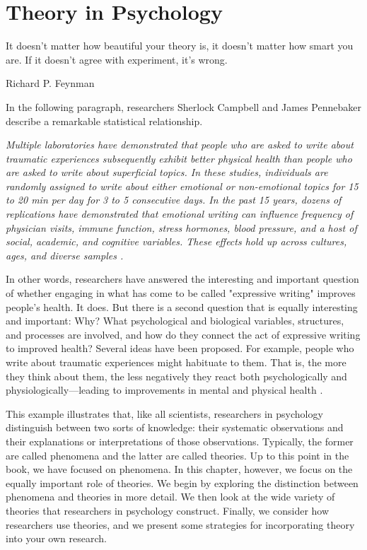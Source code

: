 \chapter{Theory in Psychology}

It doesn't matter how beautiful your theory is, it doesn't matter how smart you are. If it doesn't agree with experiment, it's wrong.

Richard P. Feynman

In the following paragraph, researchers Sherlock Campbell and James Pennebaker describe a remarkable statistical relationship.

\emph{Multiple laboratories have demonstrated that people who are asked to write about traumatic experiences subsequently exhibit better physical health than people who are asked to write about superficial topics. In these studies, individuals are randomly assigned to write about either emotional or non-emotional topics for 15 to 20 min per day for 3 to 5 consecutive days. In the past 15 years, dozens of replications have demonstrated that emotional writing can influence frequency of physician visits, immune function, stress hormones, blood pressure, and a host of social, academic, and cognitive variables. These effects hold up across cultures, ages, and diverse samples \citep{campbell_secret_2003}.}

In other words, researchers have answered the interesting and important question of whether engaging in what has come to be called "expressive writing" improves people's health. It does. But there is a second question that is equally interesting and important: Why? What psychological and biological variables, structures, and processes are involved, and how do they connect the act of expressive writing to improved health? Several ideas have been proposed. For example, people who write about traumatic experiences might habituate to them. That is, the more they think about them, the less negatively they react both psychologically and physiologically---leading to improvements in mental and physical health \citep{lepore_expressive_2002}.

This example illustrates that, like all scientists, researchers in psychology distinguish between two sorts of knowledge: their systematic observations and their explanations or interpretations of those observations. Typically, the former are called phenomena and the latter are called theories. Up to this point in the book, we have focused on phenomena. In this chapter, however, we focus on the equally important role of theories. We begin by exploring the distinction between phenomena and theories in more detail. We then look at the wide variety of theories that researchers in psychology construct. Finally, we consider how researchers use theories, and we present some strategies for incorporating theory into your own research.

